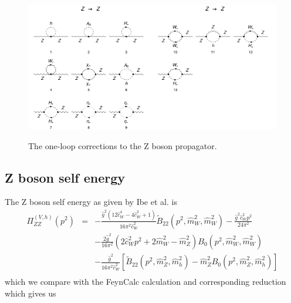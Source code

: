 \documentclass[11pt]{article}
\begin{document}
\begin{figure}[h!]
\center
\includegraphics[width=0.5\textwidth]{diagrams_V[2]_1_1.pdf}\includegraphics[width=0.5\textwidth]{diagrams_V[2]_1_2.pdf}
\caption{The one-loop corrections to the Z boson propagator.}\label{fig:gammagamma}
\end{figure}

\subsection{Z boson self energy}

The Z boson self energy as given by Ibe et al. is
{
\begin{eqnarray}
\Pi_{ZZ}^{(V,h)}(p^2) &=& 
-\frac{ \hat{g}^2 (12\hat{c}_W^4 - 4\hat{c}_W^2 + 1) }{16\pi^2 \hat{c}_W^2}
\tilde B_{22}(p^2, \hat{m}_W^2, \hat{m}_W^2) 
-\frac{ \hat{g}^2 \hat{c}_W^2 p^2 }{24\pi^2} \nonumber \\
&& -\frac{2\hat{g}^2}{16\pi^2}(2\hat{c}_W^2 p^2 + 2\hat{m}_W^2 - \hat{m}_Z^2)
B_0(p^2, \hat{m}_W^2, \hat{m}_W^2) \nonumber \\
&& -\frac{ \hat{g}^2 }{16\pi^2 \hat{c}_W^2}
[\tilde B_{22}(p^2, \hat{m}_Z^2, \hat{m}_h^2)
-\hat{m}_Z^2 B_0(p^2, \hat{m}_Z^2, \hat{m}_h^2) ]\\
\end{eqnarray}
}
which we compare with the FeynCalc calculation and corresponding reduction which gives us
\end{document}
